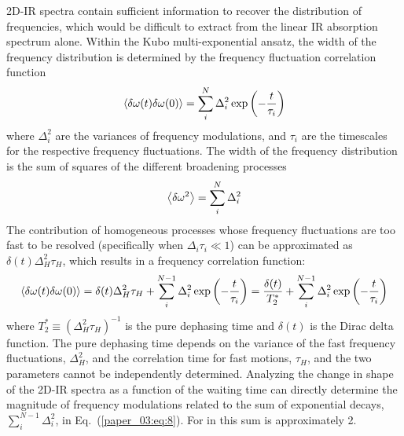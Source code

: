 \documentclass[%
  class = book,%
  crop = false,%
  float = true,%
  multi = true,%
  preview = false,%
]{standalone}
\begin{document}
2D-IR spectra contain sufficient information to recover the distribution of frequencies, which would be difficult to extract from the linear IR absorption spectrum alone.\cite{Brinzer2015} Within the Kubo multi-exponential ansatz, the width of the frequency distribution is determined by the frequency fluctuation correlation function
\begin{equation}
  \label{paper_03:eq:6}
  \Braket{\delta\omega(t)\delta\omega(0)} = \sum_{i}^{N} \Delta_{i}^{2}\exp\left( - \frac{t}{\tau_{i}} \right)
\end{equation}
where \(\Delta_{i}^{2}\) are the variances of frequency modulations, and \(\tau_{i}\) are the timescales for the respective frequency fluctuations. The width of the frequency distribution is the sum of squares of the different broadening processes
\begin{equation}
  \label{paper_03:eq:7}
  \Braket{\delta\omega^{2}} = \sum_{i}^{N} \Delta_{i}^{2}
\end{equation}
The contribution of homogeneous processes whose frequency fluctuations are too fast to be resolved (specifically when \(\Delta_{i}\tau_{i} \ll 1\)) can be approximated as \(\delta(t)\Delta_{H}^{2}\tau_{H}\), which results in a frequency correlation function:
\begin{equation}
  \label{paper_03:eq:8}
  \Braket{\delta\omega(t)\delta\omega(0)} = \delta(t)\Delta_{H}^{2}\tau_{H} + \sum_{i}^{N - 1}{\Delta_{i}^{2}\exp\left( - \frac{t}{\tau_{i}} \right)} = \frac{\delta(t)}{T_{2}^{*}} + \sum_{i}^{N - 1}{\Delta_{i}^{2}\exp\left( - \frac{t}{\tau_{i}} \right)}
\end{equation}
where \(T_{2}^{*} \equiv \left( \Delta_{H}^{2}\tau_{H} \right)^{- 1}\) is the pure dephasing time and \(\delta(t)\) is the Dirac delta function. The pure dephasing time depends on the variance of the fast frequency fluctuations, \(\Delta_{H}^{2}\), and the correlation time for fast motions, \(\tau_{H}\), and the two parameters cannot be independently determined. Analyzing the change in shape of the 2D-IR spectra as a function of the waiting time can directly determine the magnitude of frequency modulations related to the sum of exponential decays, \(\sum_{i}^{N - 1}\Delta_{i}^{2}\), in Eq.~(\ref{paper_03:eq:8}). For  in \ce{[C4C1im][PF6]} this sum is approximately \SI{2}{\wavenumber}.\cite{Brinzer2015}
\end{document}
